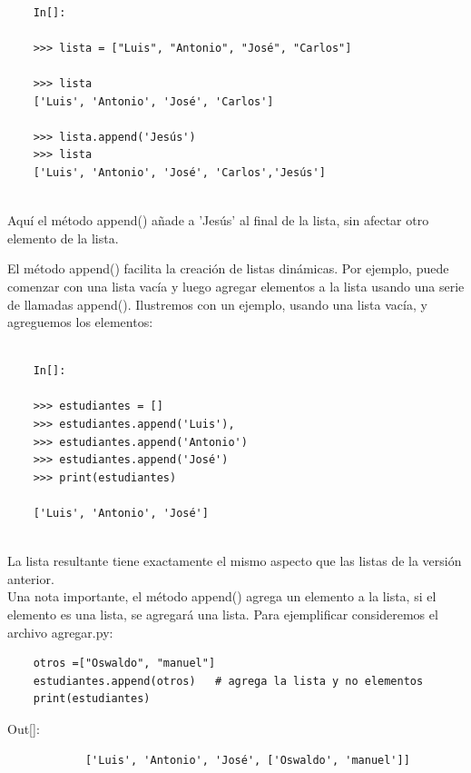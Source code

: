 \begin{lstlisting}
	
	In[]:
	
	>>> lista = ["Luis", "Antonio", "José", "Carlos"]
	
	>>> lista
	['Luis', 'Antonio', 'José', 'Carlos']
	
	>>> lista.append('Jesús')
	>>> lista
	['Luis', 'Antonio', 'José', 'Carlos','Jesús']
	
\end{lstlisting} Aquí el método {\ttfamily append()} añade a {\ttfamily 'Jesús'} al final de la lista, sin
afectar  otro elemento de la lista.


El método {\ttfamily append()} facilita la creación de listas dinámicas. Por ejemplo,
puede comenzar con una lista vacía y luego agregar elementos a la lista usando una serie
de llamadas  {\ttfamily append()}. Ilustremos con un ejemplo, usando una lista vacía, y agreguemos los elementos: 

\begin{lstlisting}
	
	In[]:
	
	>>> estudiantes = []
	>>> estudiantes.append('Luis'), 
	>>> estudiantes.append('Antonio')
	>>> estudiantes.append('José')
	>>> print(estudiantes)
	
	['Luis', 'Antonio', 'José']
	
\end{lstlisting}  La lista resultante tiene exactamente el mismo aspecto que las listas de la versión anterior.\\


Una nota importante, el método  {\ttfamily append()} agrega un elemento a la lista, si el elemento es una lista, se agregará una lista. Para ejemplificar consideremos el archivo {\ttfamily agregar.py}: 

\hspace{-2.3cm}{\ttfamily \scriptsize agregar.py}\vspace{-0.5cm}
\begin{lstlisting}		
	otros =["Oswaldo", "manuel"]
	estudiantes.append(otros)   # agrega la lista y no elementos
	print(estudiantes)	
\end{lstlisting}	


{\ttfamily\scriptsize\scriptsize 
	\hspace{-0.65cm}Out[]:\vspace{-0.05cm}	
	{\color{blue} 	
		\begin{verbatim}			
			['Luis', 'Antonio', 'José', ['Oswaldo', 'manuel']]
		\end{verbatim}
}}

